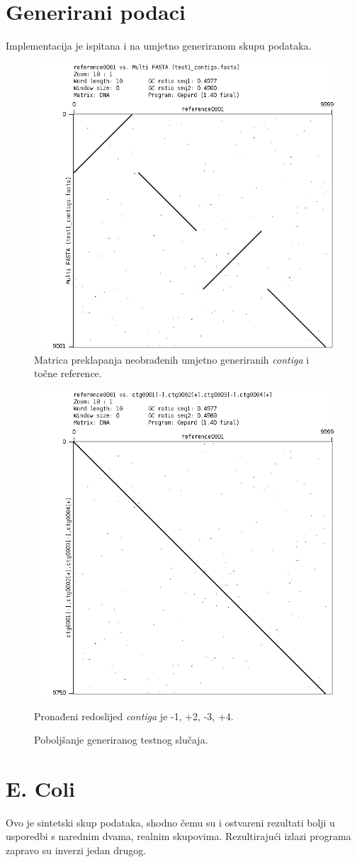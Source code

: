 \documentclass[times, utf8, seminar, numeric]{fer}
\begin{document}
\section{Generirani podaci}
Implementacija je ispitana i na umjetno generiranom skupu podataka.

\begin{figure}[h]
	\centering
	\centerline{\includegraphics[width=0.6\linewidth]{img/generated}}
	\caption{Matrica preklapanja neobrađenih umjetno generiranih \textit{contiga} i točne reference.}
	\label{fig:generated}
\end{figure}

\begin{figure}[h]
	\centering
	\centerline{\includegraphics[width=0.6\linewidth]{img/generated_reference}}
	\caption{Poboljšanje generiranog testnog slučaja.}
	\label{fig:generatedreference}
	\small
	Pronađeni redoslijed \textit{contiga} je -1, +2, -3, +4.
\end{figure}



\section{E. Coli}
Ovo je sintetski skup podataka, shodno čemu su i ostvareni rezultati bolji u usporedbi s narednim dvama, realnim skupovima. Rezultirajući izlazi programa zapravo su inverzi jedan drugog.
\end{document}

